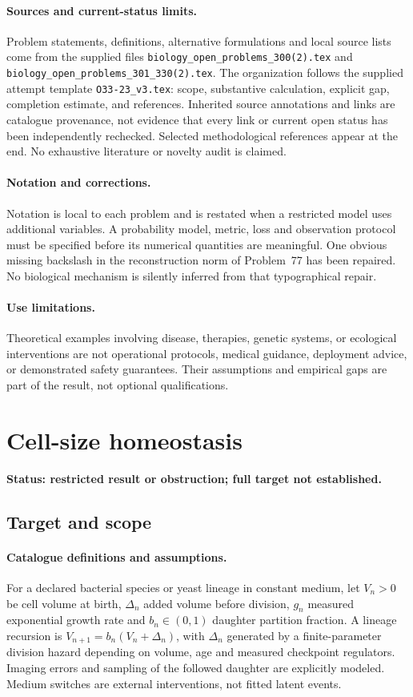 \documentclass[11pt]{article}
\begin{document}
\paragraph{Sources and current-status limits.}
Problem statements, definitions, alternative formulations and local source lists
come from the supplied files
\texttt{biology\_open\_problems\_300(2).tex} and
\texttt{biology\_open\_problems\_301\_330(2).tex}.
The organization follows the supplied attempt template
\texttt{O33-23\_v3.tex}: scope, substantive calculation, explicit gap,
completion estimate, and references. Inherited source annotations and links are
catalogue provenance, not evidence that every link or current open status has
been independently rechecked. Selected methodological references appear at the
end. No exhaustive literature or novelty audit is claimed.

\paragraph{Notation and corrections.}
Notation is local to each problem and is restated when a restricted model uses
additional variables. A probability model, metric, loss and observation protocol
must be specified before its numerical quantities are meaningful. One obvious
missing backslash in the reconstruction norm of Problem~77 has been repaired.
No biological mechanism is silently inferred from that typographical repair.

\paragraph{Use limitations.}
Theoretical examples involving disease, therapies, genetic systems, or ecological
interventions are not operational protocols, medical guidance, deployment advice,
or demonstrated safety guarantees. Their assumptions and empirical gaps are part
of the result, not optional qualifications.


\section*{Cell-size homeostasis}
\label{prob:008}
\noindent\textbf{Status: restricted result or obstruction; full target not established.}
\subsection{Target and scope}
\paragraph{Catalogue definitions and assumptions.}
For a declared bacterial species or yeast lineage in constant medium, let $V_n>0$ be cell volume at birth, $\Delta_n$ added volume before division, $g_n$ measured exponential growth rate and $b_n\in(0,1)$ daughter partition fraction. A lineage recursion is $V_{n+1}=b_n(V_n+\Delta_n)$, with $\Delta_n$ generated by a finite-parameter division hazard depending on volume, age and measured checkpoint regulators. Imaging errors and sampling of the followed daughter are explicitly modeled. Medium switches are external interventions, not fitted latent events.
\end{document}
